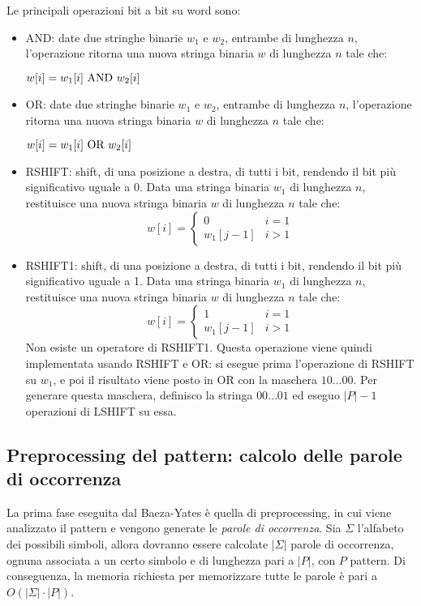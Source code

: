 Le principali operazioni bit a bit su word sono:
\begin{itemize}
    \item AND: date due stringhe binarie $w_1$ e $w_2$, entrambe di lunghezza $n$, l'operazione ritorna una nuova stringa binaria $w$ di lunghezza $n$ tale che:
    \begin{center}
        $w[i] = w_1[i] \textnormal{ AND } w_2[i]$
    \end{center}
    \item OR: date due stringhe binarie $w_1$ e $w_2$, entrambe di lunghezza $n$, l'operazione ritorna una nuova stringa binaria $w$ di lunghezza $n$ tale che:
    \begin{center}
        $w[i] = w_1[i] \textnormal{ OR } w_2[i]$
    \end{center}
    \item RSHIFT: shift, di una posizione a destra, di tutti i bit, rendendo il bit più significativo uguale a 0.
    Data una stringa binaria $w_1$ di lunghezza $n$, restituisce una nuova stringa binaria $w$ di lunghezza $n$ tale che:
    \begin{equation*}
        w[i] = \begin{cases}
            0 & i = 1 \\
            w_1[j-1] & i > 1
        \end{cases}
    \end{equation*}
    \item RSHIFT1: shift, di una posizione a destra, di tutti i bit, rendendo il bit più significativo uguale a 1.
    Data una stringa binaria $w_1$ di lunghezza $n$, restituisce una nuova stringa binaria $w$ di lunghezza $n$ tale che:
    \begin{equation*}
        w[i] = \begin{cases}
            1 & i = 1 \\
            w_1[j-1] & i > 1
        \end{cases}
    \end{equation*}
    Non esiste un operatore di RSHIFT1. Questa operazione viene quindi implementata usando RSHIFT e OR:
    si esegue prima l'operazione di RSHIFT su $w_1$, e poi il risultato viene posto in OR con la maschera $10\ldots00$.
    Per generare questa maschera, definisco la stringa $00\ldots01$ ed eseguo $|P|- 1$ operazioni di LSHIFT su essa.
\end{itemize}

\subsection*{Preprocessing del pattern: calcolo delle parole di occorrenza}
La prima fase eseguita dal Baeza-Yates è quella di preprocessing, in cui viene analizzato il pattern e vengono generate le \textit{parole di occorrenza}.
Sia $\Sigma$ l'alfabeto dei possibili simboli, allora dovranno essere calcolate $|\Sigma|$ parole di occorrenza, ognuna associata a un certo simbolo e di lunghezza pari a $|P|$, con $P$ pattern.
Di conseguenza, la memoria richiesta per memorizzare tutte le parole è pari a $O(|\Sigma| \cdot |P|)$.

